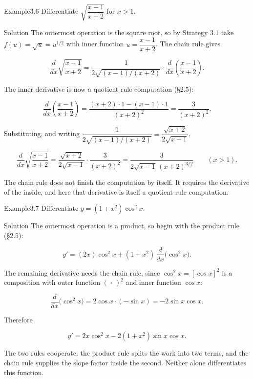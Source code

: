 \documentclass[a4paper,12pt,oneside]{memoir}
\begin{document}
\begin{workedexample}
\begin{envexample}{Example}{3.6}{}
Differentiate \(\sqrt{\dfrac{x - 1}{x + 2}}\) for \(x > 1\).
\end{envexample}
\begin{envsolution}{Solution}{}{}
The outermost operation is the square root, so by Strategy 3.1 take \(f(u) = \sqrt{u} = u^{1/2}\) with inner function \(u = \dfrac{x - 1}{x + 2}\). The chain rule gives

\[ \frac{d}{dx}\sqrt{\frac{x - 1}{x + 2}} = \frac{1}{2\sqrt{(x - 1)/(x + 2)}}\cdot\frac{d}{dx}\!\left(\frac{x - 1}{x + 2}\right). \]

The inner derivative is now a quotient-rule computation (§2.5):

\[ \frac{d}{dx}\!\left(\frac{x - 1}{x + 2}\right) = \frac{(x + 2)\cdot 1 - (x - 1)\cdot 1}{(x + 2)^{2}} = \frac{3}{(x + 2)^{2}}. \]

Substituting, and writing \(\dfrac{1}{2\sqrt{(x - 1)/(x + 2)}} = \dfrac{\sqrt{x + 2}}{2\sqrt{x - 1}}\),

\[ \frac{d}{dx}\sqrt{\frac{x - 1}{x + 2}} = \frac{\sqrt{x + 2}}{2\sqrt{x - 1}}\cdot\frac{3}{(x + 2)^{2}} = \frac{3}{2\sqrt{x - 1}\,(x + 2)^{3/2}} \qquad (x > 1). \]

The chain rule does not finish the computation by itself. It requires the derivative of the inside, and here that derivative is itself a quotient-rule computation.
\end{envsolution}
\end{workedexample}
\begin{workedexample}
\begin{envexample}{Example}{3.7}{}
Differentiate \(y = (1 + x^{2})\cos^{2} x\).
\end{envexample}
\begin{envsolution}{Solution}{}{}
The outermost operation is a product, so begin with the product rule (§2.5):

\[ y' = (2x)\cos^{2} x + (1 + x^{2})\,\frac{d}{dx}\bigl(\cos^{2} x\bigr). \]

The remaining derivative needs the chain rule, since \(\cos^{2} x = [\cos x]^{2}\) is a composition with outer function \((\,\cdot\,)^{2}\) and inner function \(\cos x\):

\[ \frac{d}{dx}\bigl(\cos^{2} x\bigr) = 2\cos x\cdot(-\sin x) = -2\sin x\cos x. \]

Therefore

\[ y' = 2x\cos^{2} x - 2(1 + x^{2})\sin x\cos x. \]

The two rules cooperate: the product rule splits the work into two terms, and the chain rule supplies the slope factor inside the second. Neither alone differentiates this function.
\end{envsolution}
\end{workedexample}
\end{document}
